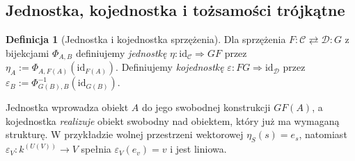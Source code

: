 \documentclass[11pt,a4paper]{article}
\numberwithin{equation}{section}
\theoremstyle{plain}
\theoremstyle{definition}
\newtheorem{definicja}[twierdzenie]{Definicja}
\theoremstyle{remark}
\newcommand{\id}{\mathrm{id}}
\begin{document}
\subsection{Jednostka, kojednostka i tożsamości trójkątne}

\begin{definicja}[Jednostka i kojednostka sprzężenia]\label{def:unit-counit}
Dla sprzężenia $F:\mathcal C\rightleftarrows\mathcal D:G$ z bijekcjami $\Phi_{A,B}$ definiujemy \emph{jednostkę} $\eta:\id_{\mathcal C}\Rightarrow GF$ przez $\eta_A:=\Phi_{A,F(A)}(\id_{F(A)})$. Definiujemy \emph{kojednostkę} $\varepsilon:FG\Rightarrow\id_{\mathcal D}$ przez $\varepsilon_B:=\Phi_{G(B),B}^{-1}(\id_{G(B)})$.
\end{definicja}

Jednostka wprowadza obiekt $A$ do jego swobodnej konstrukcji $GF(A)$, a kojednostka \emph{realizuje} obiekt swobodny nad obiektem, który już ma wymaganą strukturę. W przykładzie wolnej przestrzeni wektorowej $\eta_S(s)=e_s$, natomiast
$\varepsilon_V:k^{(U(V))}\to V$ spełnia $\varepsilon_V(e_v)=v$ i jest liniowa.
\end{document}
